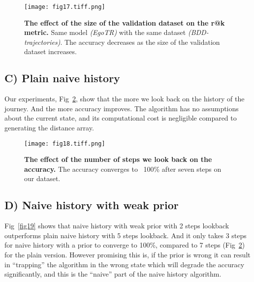 \documentclass[10pt,letterpaper]{article}
\begin{document}
\begin{table}[!ht]
  \centering
  \caption{
  {\bf r@k metrics of EgoTR fine-tuned over the reshaped BDD-trajectories dataset.}}
  \label{table6}
\end{table}

\begin{figure}[!ht]
  \caption{{\bf The effect of the size of the validation dataset on the r@k metric.}  Same model \emph{(EgoTR)} with the same dataset \emph{(BDD-trajectories)}. The accuracy decreases as the size of the validation dataset increases.}
  \texttt{[image: fig17.tiff.png]}
  \label{fig17}
\end{figure}

\FloatBarrier

\subsection*{C) Plain naive history}
Our experiments, Fig~\ref{fig18}, show that the more we look back on the history of the journey. And the more accuracy improves. The algorithm has no assumptions about the current state, and its computational cost is negligible compared to generating the distance array.

\begin{figure}[!ht]
  \caption{{\bf The effect of the number of steps we look back on the accuracy.} The accuracy converges to ~100\% after seven steps on our dataset.}
  \texttt{[image: fig18.tiff.png]}
  \label{fig18}
\end{figure}
\FloatBarrier

\subsection*{D) Naive history with weak prior}
Fig~\ref{fig19} shows that naive history with weak prior with 2 steps lookback outperforms plain naive history with 5 steps lookback. And it only takes 3 steps for naive history with a prior to converge to 100\%, compared to 7 steps (Fig~\ref{fig18}) for the plain version. 
However promising this is, if the prior is wrong it can result in “trapping” the algorithm in the wrong state which will degrade the accuracy significantly, and this is the “naive” part of the naive history algorithm.
\end{document}
